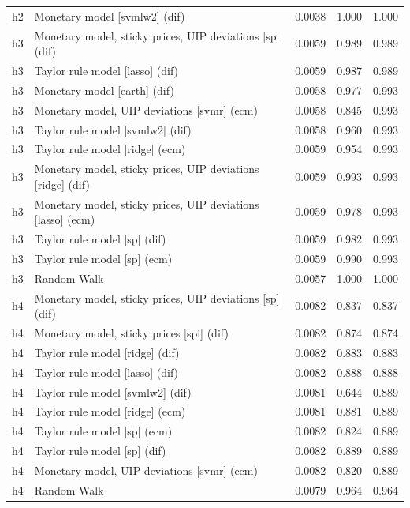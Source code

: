 \begin{ThreePartTable}
\begin{longtable}[t]{cp{5.5cm}ccc}
h2 & \raggedright Monetary model [svmlw2] (dif) & 0.0038 & 1.000 & 1.000\\
\addlinespace
h3 & \raggedright Monetary model, sticky prices, UIP deviations [sp] (dif) & 0.0059 & 0.989 & 0.989\\
h3 & \raggedright Taylor rule model [lasso] (dif) & 0.0059 & 0.987 & 0.989\\
h3 & \raggedright Monetary model [earth] (dif) & 0.0058 & 0.977 & 0.993\\
h3 & \raggedright Monetary model, UIP deviations [svmr] (ecm) & 0.0058 & 0.845 & 0.993\\
h3 & \raggedright Taylor rule model [svmlw2] (dif) & 0.0058 & 0.960 & 0.993\\
h3 & \raggedright Taylor rule model [ridge] (ecm) & 0.0059 & 0.954 & 0.993\\
h3 & \raggedright Monetary model, sticky prices, UIP deviations [ridge] (dif) & 0.0059 & 0.993 & 0.993\\
h3 & \raggedright Monetary model, sticky prices, UIP deviations [lasso] (ecm) & 0.0059 & 0.978 & 0.993\\
h3 & \raggedright Taylor rule model [sp] (dif) & 0.0059 & 0.982 & 0.993\\
h3 & \raggedright Taylor rule model [sp] (ecm) & 0.0059 & 0.990 & 0.993\\
h3 & \raggedright Random Walk & 0.0057 & 1.000 & 1.000\\
\addlinespace
h4 & \raggedright Monetary model, sticky prices, UIP deviations [sp] (dif) & 0.0082 & 0.837 & 0.837\\
h4 & \raggedright Monetary model, sticky prices [spi] (dif) & 0.0082 & 0.874 & 0.874\\
h4 & \raggedright Taylor rule model [ridge] (dif) & 0.0082 & 0.883 & 0.883\\
h4 & \raggedright Taylor rule model [lasso] (dif) & 0.0082 & 0.888 & 0.888\\
h4 & \raggedright Taylor rule model [svmlw2] (dif) & 0.0081 & 0.644 & 0.889\\
h4 & \raggedright Taylor rule model [ridge] (ecm) & 0.0081 & 0.881 & 0.889\\
h4 & \raggedright Taylor rule model [sp] (ecm) & 0.0082 & 0.824 & 0.889\\
h4 & \raggedright Taylor rule model [sp] (dif) & 0.0082 & 0.889 & 0.889\\
h4 & \raggedright Monetary model, UIP deviations [svmr] (ecm) & 0.0082 & 0.820 & 0.889\\
h4 & \raggedright Random Walk & 0.0079 & 0.964 & 0.964\\

\end{longtable}
\end{ThreePartTable}
